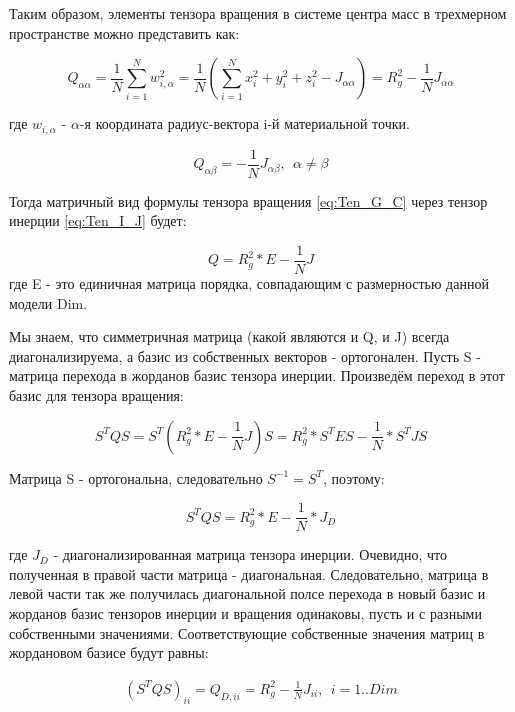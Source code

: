 Таким образом, элементы тензора вращения в системе центра масс в трехмерном пространстве можно представить как:

\begin{equation}
   Q_{\alpha\alpha} = \frac{1}{N}\sum^{N}_{i=1}w_{i,\alpha}^2 = \frac{1}{N} \left(\sum_{i=1}^{N}x_{i}^{2} + y_{i}^{2} + z_{i}^{2} - J_{\alpha\alpha}\right) = R^{2}_{g} - \frac{1}{N} J_{\alpha\alpha}  
\end{equation}

где $w_{i,\alpha}$ - $\alpha$-я координата радиус-вектора i-й материальной точки.

\begin{equation}
    Q_{\alpha\beta} = -\frac{1}{N} J_{\alpha\beta},\ \ \alpha \neq \beta
\end{equation}

Тогда матричный вид формулы тензора вращения \eqref{eq:Ten_G_C} через тензор инерции \eqref{eq:Ten_I_J} будет:

\begin{equation}
    Q = R_{g}^{2} * E - \frac{1}{N} J
\end{equation}
где E - это единичная матрица порядка, совпадающим с размерностью данной модели Dim.

Мы знаем, что симметричная матрица (какой являются и Q, и J) всегда диагонализируема, а базис из собственных векторов - ортогонален. Пусть S - матрица перехода в жорданов базис тензора инерции. Произведём переход в этот базис для тензора вращения:

\begin{equation*}
    S^{T}QS = S^{T} (R_{g}^{2} * E - \frac{1}{N} J) S = R^{2}_{g} * S^{T}ES-\frac{1}{N} * S^{T}JS
\end{equation*}

Матрица S - ортогональна, следовательно $S^{-1} = S^{T}$, поэтому:

\begin{equation}
    S^{T}QS = R^{2}_{g} * E - \frac{1}{N} * J_{D}
\end{equation}

где $J_{D}$ - диагонализированная матрица тензора инерции. Очевидно, что полученная в правой части матрица - диагональная. Следовательно, матрица в левой части так же получилась диагональной полсе перехода в новый базис и жорданов базис тензоров инерции и вращения одинаковы, пусть и с разными собственными значениями. Соответствующие собственные значения матриц в жордановом базисе будут равны:

\begin{align*}
    (S^{T}QS)_{ii} = Q_{D, ii} = R^{2}_{g} - \frac{1}{N}J_{ii},\ \ i=1..Dim
\end{align*}

